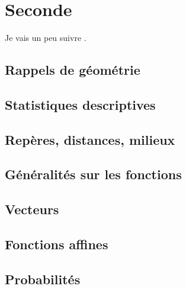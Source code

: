 \documentclass[a4paper,12pt]{book}
\begin{document}




\newpage



\tableofcontents

\newpage

\part{Seconde}

Je vais un peu suivre \cite{oklaEg}.
\setcounter{chapter}{-1}

\chapter{Rappels de géométrie}


\chapter{Statistiques descriptives}




\chapter{Repères, distances, milieux}


\chapter{Généralités sur les fonctions}


\chapter{Vecteurs}


\chapter{Fonctions affines}


\chapter{Probabilités}

\end{document}
